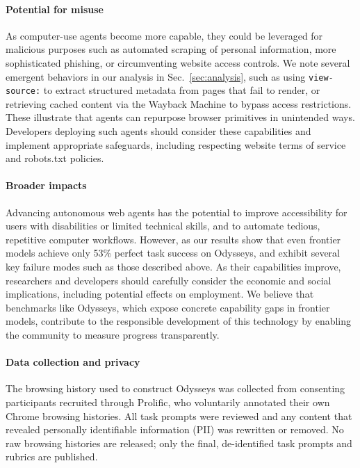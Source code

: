 \documentclass{article}
\theoremstyle{plain}
\theoremstyle{definition}
\theoremstyle{remark}
\def\odysseys{Odysseys\xspace}
\begin{document}
\paragraph{Potential for misuse} As computer-use agents become more capable, they could be leveraged for malicious purposes such as automated scraping of personal information, more sophisticated phishing, or circumventing website access controls. We note several emergent behaviors in our analysis in Sec.~\ref{sec:analysis}, such as using \texttt{view-source:} to extract structured metadata from pages that fail to render, or retrieving cached content via the Wayback Machine to bypass access restrictions. These illustrate that agents can repurpose browser primitives in unintended ways. Developers deploying such agents should consider these capabilities and implement appropriate safeguards, including respecting website terms of service and robots.txt policies.

\paragraph{Broader impacts} Advancing autonomous web agents has the potential to improve accessibility for users with disabilities or limited technical skills, and to automate tedious, repetitive computer workflows. However, as our results show that even frontier models achieve only 53\% perfect task success on \odysseys, and exhibit several key failure modes such as those described above. As their capabilities improve, researchers and developers should carefully consider the economic and social implications, including potential effects on employment. We believe that benchmarks like \odysseys, which expose concrete capability gaps in frontier models, contribute to the responsible development of this technology by enabling the community to measure progress transparently.

\paragraph{Data collection and privacy} The browsing history used to construct \odysseys was collected from consenting participants recruited through Prolific, who voluntarily annotated their own Chrome browsing histories. All task prompts were reviewed and any content that revealed personally identifiable information (PII) was rewritten or removed. No raw browsing histories are released; only the final, de-identified task prompts and rubrics are published.
\end{document}
